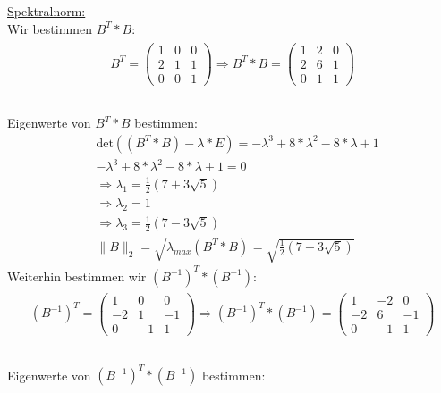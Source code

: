 \underline{Spektralnorm:}\\
Wir bestimmen $B^T*B$:\\
\begin{align*}
\begin{split}
B^T =
\begin{pmatrix}
1 & 0 & 0\\
2 & 1 & 1\\
0 & 0 & 1
\end{pmatrix}
\Rightarrow B^T*B=
\begin{pmatrix}
1 & 2 & 0\\
2 & 6 & 1\\
0 & 1 & 1
\end{pmatrix}\\
\end{split}
\end{align*}\\
Eigenwerte von $B^T*B$ bestimmen:\\
\begin{align*}
&\mathrm{det}\left((B^T*B)-\lambda*E\right)=-\lambda^3+8*\lambda^2-8*\lambda+1\\
&-\lambda^3+8*\lambda^2-8*\lambda+1=0\\
&\Rightarrow \lambda_{1}=\frac{1}{2}(7+3\sqrt{5})\\
&\Rightarrow\lambda_{2}=1\\
&\Rightarrow\lambda_{3}=\frac{1}{2}(7-3\sqrt{5})\\
&\|B\|_2=\sqrt{\lambda_{max}(B^T*B)}=\sqrt{\frac{1}{2}(7+3\sqrt{5})}
\end{align*}
Weiterhin bestimmen wir $(B^{-1})^T*(B^{-1})$:\\
\begin{align*}
\begin{split}
(B^{-1})^T =
\begin{pmatrix}
1 & 0 & 0\\
-2 & 1 & -1\\
0 & -1 & 1
\end{pmatrix}
\Rightarrow (B^{-1})^T*(B^{-1})=
\begin{pmatrix}
1 & -2 & 0\\
-2 & 6 & -1\\
0 & -1 & 1
\end{pmatrix}\\
\end{split}
\end{align*}\\
Eigenwerte von $(B^{-1})^T*(B^{-1})$ bestimmen:\\
